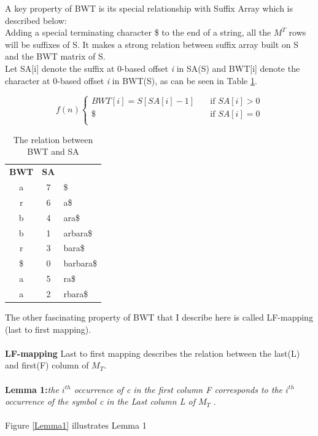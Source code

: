 \documentclass[11pt,a4paper]{report}
\begin{document}
A key property of BWT is its special relationship with Suffix Array which is described below: \\
Adding a special terminating character \$ to the end of a string, all the $M^T$ rows will be suffixes of S. 
It makes a strong relation between suffix array built on S and the BWT matrix of S.\\
Let SA[i] denote the suffix at 0-based offset \emph{i} in SA(S) and BWT[i] denote the character 
at 0-based offset \emph{i} in BWT(S)\cite{bwt}, as can be seen in Table \ref{BWT&SA}.




\[ f(n)
\begin{cases}
    BWT[i]=S[SA[i]-1]   & \quad \text{if } SA[i] > 0\\
    \$  & \quad \text{if } SA[i]= 0\\
\end{cases}
\]


\begin{table}[h]
\centering
  \begin{tabular}{ c c l}
  \textbf{  BWT} & \textbf{SA } & \\ 
       a 	&	 7	 &   \$\\  
       r 	&	 6	 &	 a\$ \\
       b 	&	 4	 &	 ara\$ \\
       b 	&	 1	 &	 arbara\$ \\
       r  	&	 3	 &	 bara\$ \\
      \$ 	&	 0	 &	 barbara\$ \\
       a 	&	 5	 &	 ra\$ \\
       a 	&	 2	 &	 rbara\$ \\

  \end{tabular}
  
\caption{The relation between BWT and SA}
\label{BWT&SA}
\end{table}


The other fascinating property of BWT that I describe here is called 
LF-mapping (last to first mapping).\\\\
\textbf{LF-mapping}  Last to first mapping describes the relation 
between the last(L) and first(F) column of $M_{T}$\cite{bwt}.\\\\
\textbf{Lemma 1:}\emph{the $i^{th}$ occurrence of c in the first 
column \emph{F} corresponds to the $i^{th}$ occurrence of the symbol 
c in the Last column \emph{L} of $M_{T}$} \cite{bwt}.\\\\
Figure \ref{Lemma1} illustrates Lemma 1\\
\end{document}
